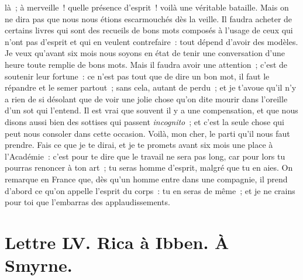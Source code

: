 \documentclass[french,twoside]{book} %
\newcommand{\dateline}[1]{\medskip{\RaggedLeft{#1}\par}\bigskip}
\begin{document}
là ; à merveille ! quelle présence d’esprit ! voilà une véritable bataille. Mais on ne dira pas que nous nous étions escarmouchés dès la veille. Il faudra acheter de certains livres qui sont des recueils de bons mots composés à l’usage de ceux qui n’ont pas d’esprit et qui en veulent contrefaire : tout dépend d’avoir des modèles. Je veux qu’avant six mois nous soyons en état de tenir une conversation d’une heure toute remplie de bons mots. Mais il faudra avoir une attention ; c’est de soutenir leur fortune : ce n’est pas tout que de dire un bon mot, il faut le répandre et le semer partout ; sans cela, autant de perdu ; et je t’avoue qu’il n’y a rien de si désolant que de voir une jolie chose qu’on dite mourir dans l’oreille d’un sot qui l’entend. Il est vrai que souvent il y a une compensation, et que nous disons aussi bien des sottises qui passent {\itshape incognito} ; et c’est la seule chose qui peut nous consoler dans cette occasion. Voilà, mon cher, le parti qu’il nous faut prendre. Fais ce que je te dirai, et je te promets avant six mois une place à l’Académie : c’est pour te dire que le travail ne sera pas long, car pour lors tu pourras renoncer à ton art ; tu seras homme d’esprit, malgré que tu en aies. On remarque en France que, dès qu’un homme entre dans une compagnie, il prend d’abord ce qu’on appelle l’esprit du corps : tu en seras de même ; et je ne crains pour toi que l’embarras des applaudissements.\par

\dateline{À Paris, le 6 de la lune de Zilcadé, 1714.}
\section[{Lettre LV. Rica à Ibben. À Smyrne.}]{Lettre LV. Rica à Ibben. À Smyrne.}\renewcommand{\leftmark}{Lettre LV. Rica à Ibben. À Smyrne.}
\end{document}
